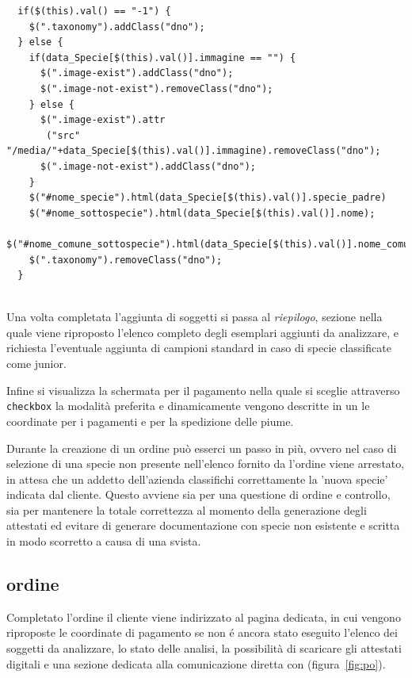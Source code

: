 \begin{footnotesize}
\begin{verbatim}
  if($(this).val() == "-1") {
    $(".taxonomy").addClass("dno");
  } else {
    if(data_Specie[$(this).val()].immagine == "") {
      $(".image-exist").addClass("dno");
      $(".image-not-exist").removeClass("dno");
    } else {
      $(".image-exist").attr
       ("src" "/media/"+data_Specie[$(this).val()].immagine).removeClass("dno");
      $(".image-not-exist").addClass("dno");
    }
    $("#nome_specie").html(data_Specie[$(this).val()].specie_padre)
    $("#nome_sottospecie").html(data_Specie[$(this).val()].nome);
    $("#nome_comune_sottospecie").html(data_Specie[$(this).val()].nome_comune);
    $(".taxonomy").removeClass("dno");
  } 
 
\end{verbatim}
\end{footnotesize}

Una volta completata l'aggiunta di soggetti si passa al \emph{riepilogo}, sezione nella quale viene riproposto l'elenco completo degli esemplari aggiunti da analizzare, e richiesta l'eventuale aggiunta di campioni standard in caso di specie classificate come junior.

Infine si visualizza la schermata per il pagamento nella quale si sceglie attraverso \texttt{checkbox} la modalità preferita e dinamicamente vengono descritte in un  le coordinate per i pagamenti e per la spedizione delle piume.

Durante la creazione di un ordine può esserci un passo in più, ovvero nel caso di selezione di una specie non presente nell'elenco fornito da {\fem} l'ordine viene arrestato, in attesa che un addetto dell'azienda classifichi correttamente la 'nuova specie' indicata dal cliente. Questo avviene sia per una questione di ordine e controllo, sia per mantenere la totale correttezza al momento della generazione degli attestati ed evitare di generare documentazione con specie non esistente e scritta in modo scorretto a causa di una svista.

\subsection*{ordine}
\label{subs:po}
Completato l'ordine il cliente viene indirizzato al pagina dedicata, in cui vengono riproposte le coordinate di pagamento se non é ancora stato eseguito l'elenco dei soggetti da analizzare, lo stato delle analisi, la possibilità di scaricare gli attestati digitali e una sezione dedicata alla comunicazione diretta con {\fem} (figura~\ref{fig:po}).


